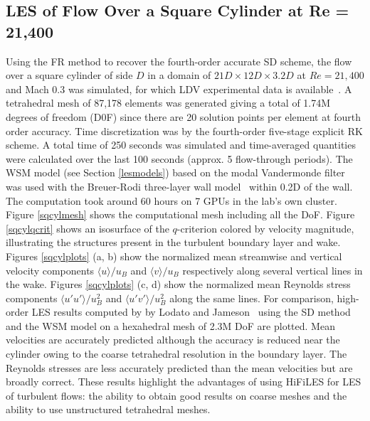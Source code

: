 \graphicspath{{figures_squarecylinder/}}%

\subsection{LES of Flow Over a Square Cylinder at Re = 21,400}\label{sqcyl}

Using the FR method to recover the fourth-order accurate SD scheme, the flow over a square cylinder of side $D$ in a domain of $21D \times 12D \times 3.2D$ at $Re = 21,400$ and Mach 0.3 was simulated, for which LDV experimental data is available~\cite{lyn1994,lyn1995}.
A tetrahedral mesh of 87,178 elements was generated giving a total of 1.74M degrees of freedom (D0F) since there are 20 solution points per element at fourth order accuracy.
Time discretization was by the fourth-order five-stage explicit RK scheme.
A total time of 250 seconds was simulated and time-averaged quantities were calculated over the last 100 seconds (approx. 5 flow-through periods).
The WSM model (see Section \ref{lesmodels}) based on the modal Vandermonde filter~\cite{bull2013a} was used with the Breuer-Rodi three-layer wall model~\cite{breuer1994} within 0.2D of the wall.
The computation took around 60 hours on 7 GPUs in the lab's own cluster.
Figure \ref{sqcylmesh} shows the computational mesh including all the DoF.
Figure \ref{sqcylqcrit} shows an isosurface of the $q$-criterion colored by velocity magnitude, illustrating the structures present in the turbulent boundary layer and wake.
Figures \ref{sqcylplots} (a, b) show the normalized mean streamwise and vertical velocity components $\langle u \rangle/u_B$ and $\langle v \rangle/u_B$ respectively along several vertical lines in the wake.
Figures \ref{sqcylplots} (c, d) show the normalized mean Reynolds stress components $\langle u'u' \rangle/u_B^2$ and $\langle u'v' \rangle/u_B^2$ along the same lines.
For comparison, high-order LES results computed by by Lodato and Jameson~\cite{lodato2012b} using the SD method and the WSM model on a hexahedral mesh of 2.3M DoF are plotted.
Mean velocities are accurately predicted although the accuracy is reduced near the cylinder owing to the coarse tetrahedral resolution in the boundary layer.
The Reynolds stresses are less accurately predicted than the mean velocities but are broadly correct.
These results highlight the advantages of using HiFiLES for LES of turbulent flows: the ability to obtain good results on coarse meshes and the ability to use unstructured tetrahedral meshes.


